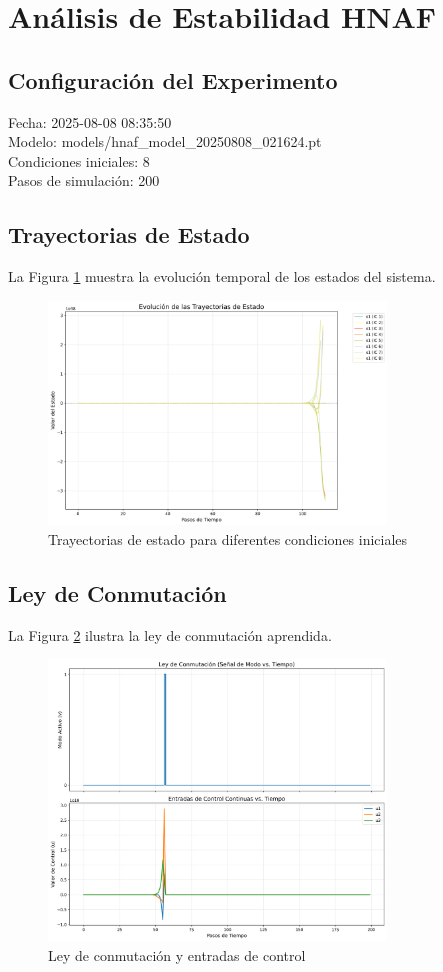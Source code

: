 \section{Análisis de Estabilidad HNAF}

\subsection{Configuración del Experimento}
Fecha: 2025-08-08 08:35:50\\Modelo: models/hnaf_model_20250808_021624.pt\\Condiciones iniciales: 8\\Pasos de simulación: 200

\subsection{Trayectorias de Estado}
La Figura \ref{fig:trajectories} muestra la evolución temporal de los estados del sistema.

\begin{figure}[h]
\centering
\includegraphics[width=0.8\textwidth]{plot_trajectories.png}
\caption{Trayectorias de estado para diferentes condiciones iniciales}
\label{fig:trajectories}
\end{figure}

\subsection{Ley de Conmutación}
La Figura \ref{fig:switching} ilustra la ley de conmutación aprendida.

\begin{figure}[h]
\centering
\includegraphics[width=0.8\textwidth]{plot_switching_signal.png}
\caption{Ley de conmutación y entradas de control}
\label{fig:switching}
\end{figure}

